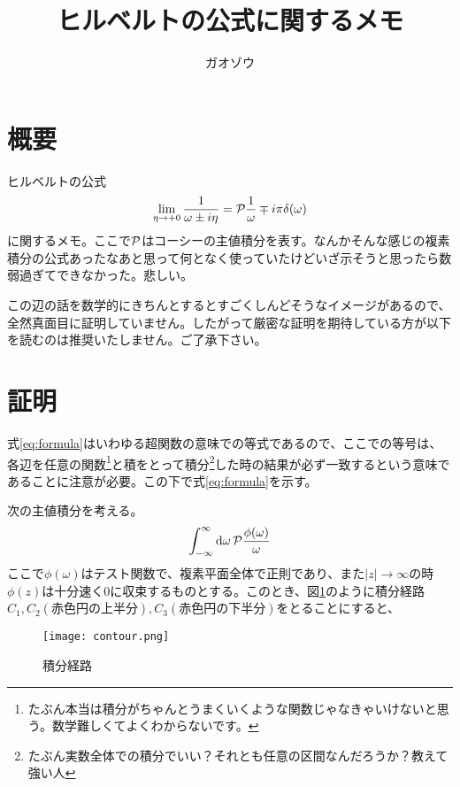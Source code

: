 \documentclass[uplatex,dvipdfmx]{jsarticle}
\title{ヒルベルトの公式に関するメモ}
\author{ガオゾウ}
\begin{document}
\maketitle
\section{概要}
ヒルベルトの公式
\begin{equation}
	\lim_{\eta \to +0}\frac{1}{\omega \pm i\eta} = \pv{\frac{1}{\omega}} \mp i\pi \delta(\omega) \label{eq:formula}
\end{equation}
に関するメモ。ここで$\pv$はコーシーの主値積分を表す。なんかそんな感じの複素積分の公式あったなあと思って何となく使っていたけどいざ示そうと思ったら数弱過ぎてできなかった。悲しい。

この辺の話を数学的にきちんとするとすごくしんどそうなイメージがあるので、全然真面目に証明していません。したがって厳密な証明を期待している方が以下を読むのは推奨いたしません。ご了承下さい。

\section{証明}
式\eqref{eq:formula}はいわゆる超関数の意味での等式であるので、ここでの等号は、各辺を任意の関数\footnote{たぶん本当は積分がちゃんとうまくいくような関数じゃなきゃいけないと思う。数学難しくてよくわからないです。}と積をとって積分\footnote{たぶん実数全体での積分でいい？それとも任意の区間なんだろうか？教えて強い人}した時の結果が必ず一致するという意味であることに注意が必要。この下で式\eqref{eq:formula}を示す。

次の主値積分を考える。
\begin{equation}
	\int_{-\infty}^{\infty} \dd{\omega} \pv{ \frac{\phi(\omega)}{\omega}}
\end{equation}
ここで$\phi(\omega)$はテスト関数で、複素平面全体で正則であり、また$|z|\to \infty$の時$\phi(z)$は十分速く$0$に収束するものとする。このとき、図\ref{fig:contour}のように積分経路$C_1, C_2(赤色円の上半分), C_3(赤色円の下半分)$をとることにすると、
\begin{figure}
	\centering
	\texttt{[image: contour.png]}
	\caption{積分経路}
	\label{fig:contour}
\end{figure}
\end{document}
